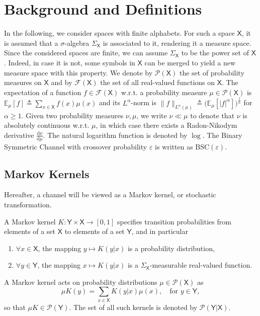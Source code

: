 \documentclass[conference,letterpaper]{IEEEtran}
\def \X{\mathsf X}
\def \Y{\mathsf Y}
\def \F{\mathcal F}
\def \calP{\mathcal P}
\newcommand{\dd}[1]{\mathrm{d}#1}
\newcommand{\mean}[2]{\mathbb{E}_{#1}\left[#2\right]}
\begin{document}
\section{Background and Definitions}\label{section:background_and_definitions}\noindent
In the following, we consider spaces with finite alphabets. For such a space $\X$, it is assumed that a $\sigma$-algebra $\Sigma_\X$ is associated to it, rendering it a measure space. Since the considered spaces are finite, we can assume $\Sigma_\X$ to be the power set of $\X$. Indeed, in case it is not, some symbols in $\X$ can be merged to yield a new measure space with this property. We denote by $\calP(\X)$ the set of probability measures on $\X$ and by $\F(\X)$ the set of all real-valued functions on $\X$. The expectation of a function $f\in\F(\X)$ w.r.t. a probability measure $\mu\in\calP(\X)$ is ${\mean{\mu}{f}\triangleq\sum_{x\in\X}f(x)\mu(x)}$ and its $L^\alpha$-norm is ${\|f\|_{L^\alpha(\mu)}\triangleq\big(\mean{\mu}{|f|^\alpha}\big)^{\frac1\alpha}}$ for $\alpha\geq1$. Given two probability measures $\nu, \mu$, we write $\nu\ll\mu$ to denote that $\nu$ is absolutely continuous w.r.t. $\mu$, in which case there exists a Radon-Nikodym derivative $\frac{\dd\nu}{\dd\mu}$. The natural logarithm function is denoted by $\log$. The Binary Symmetric Channel with crossover probability $\varepsilon$ is written as $\mathrm{BSC}(\varepsilon)$.

\subsection{Markov Kernels}\label{sec:markov_kernels}\noindent
Hereafter, a channel will be viewed as a Markov kernel, or stochastic transformation.
\begin{definition}
    A Markov kernel $K:\Y\times\X\to[0, 1]$ specifies transition probabilities from elements of a set $\X$ to elements of a set $\Y$, and in particular
\begin{enumerate}
    \item $\forall x\in\X$, the mapping $y\mapsto K(y|x)$ is a probability distribution,
    \item $\forall y\in\Y$, the mapping $x\mapsto K(y|x)$ is a $\Sigma_\X$-measurable real-valued function.
\end{enumerate}
\end{definition}

A Markov kernel acts on probability distributions $\mu\in\calP(\X)$ as
\begin{equation*}
    \mu K (y) = \sum_{x\in\X} K(y|x)\mu(x), \quad \text{for }y\in\Y,
\end{equation*}
so that $\mu K\in\calP(\Y)$.
The set of all such kernels is denoted by $\calP(\Y|\X)$. 
\end{document}
